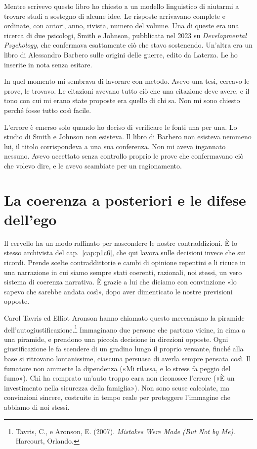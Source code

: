 \begin{casopersonale}
Mentre scrivevo questo libro ho chiesto a un modello linguistico di aiutarmi a trovare studi a sostegno di alcune idee. Le risposte arrivavano complete e ordinate, con autori, anno, rivista, numero del volume. Una di queste era una ricerca di due psicologi, Smith e Johnson, pubblicata nel 2023 su \textit{Developmental Psychology}, che confermava esattamente ciò che stavo sostenendo. Un'altra era un libro di Alessandro Barbero sulle origini delle guerre, edito da Laterza. Le ho inserite in nota senza esitare.

In quel momento mi sembrava di lavorare con metodo. Avevo una tesi, cercavo le prove, le trovavo. Le citazioni avevano tutto ciò che una citazione deve avere, e il tono con cui mi erano state proposte era quello di chi sa. Non mi sono chiesto perché fosse tutto così facile.

L'errore è emerso solo quando ho deciso di verificare le fonti una per una. Lo studio di Smith e Johnson non esisteva. Il libro di Barbero non esisteva nemmeno lui, il titolo corrispondeva a una sua conferenza. Non mi aveva ingannato nessuno. Avevo accettato senza controllo proprio le prove che confermavano ciò che volevo dire, e le avevo scambiate per un ragionamento.
\end{casopersonale}

\section{La coerenza a posteriori e le difese dell'ego}

Il cervello ha un modo raffinato per nascondere le nostre contraddizioni. È lo stesso archivista del cap.~\ref{cap:p1c6}, che qui lavora sulle decisioni invece che sui ricordi. Prende scelte contraddittorie e cambi di opinione repentini e li ricuce in una narrazione in cui siamo sempre stati coerenti, razionali, noi stessi, un vero sistema di coerenza narrativa. È grazie a lui che diciamo con convinzione «lo sapevo che sarebbe andata così», dopo aver dimenticato le nostre previsioni opposte.

Carol Tavris ed Elliot Aronson hanno chiamato questo meccanismo la piramide dell'autogiustificazione.\footnote{Tavris, C., e Aronson, E. (2007). \textit{Mistakes Were Made (But Not by Me)}. Harcourt, Orlando.} Immaginano due persone che partono vicine, in cima a una piramide, e prendono una piccola decisione in direzioni opposte. Ogni giustificazione le fa scendere di un gradino lungo il proprio versante, finché alla base si ritrovano lontanissime, ciascuna persuasa di averla sempre pensata così. Il fumatore non ammette la dipendenza («Mi rilassa, e lo stress fa peggio del fumo»). Chi ha comprato un'auto troppo cara non riconosce l'errore («È un investimento nella sicurezza della famiglia»). Non sono scuse calcolate, ma convinzioni sincere, costruite in tempo reale per proteggere l'immagine che abbiamo di noi stessi.

